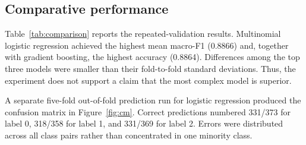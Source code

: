 \documentclass[review]{elsarticle}
\begin{document}
\subsection{Comparative performance}
Table~\ref{tab:comparison} reports the repeated-validation results. Multinomial logistic regression achieved the highest mean macro-F1 (0.8866) and, together with gradient boosting, the highest accuracy (0.8864). Differences among the top three models were smaller than their fold-to-fold standard deviations. Thus, the experiment does not support a claim that the most complex model is superior.

\begin{table}[t]
\caption{Five-times repeated five-fold stratified cross-validation. Values are mean $\pm$ standard deviation across 25 held-out folds.}
\label{tab:comparison}
\centering
{}
\end{table}

A separate five-fold out-of-fold prediction run for logistic regression produced the confusion matrix in Figure~\ref{fig:cm}. Correct predictions numbered 331/373 for label 0, 318/358 for label 1, and 331/369 for label 2. Errors were distributed across all class pairs rather than concentrated in one minority class.
\end{document}
